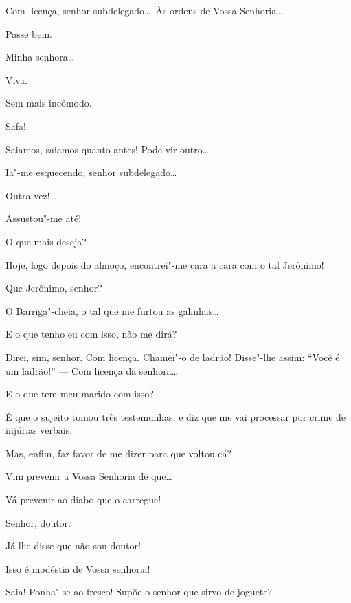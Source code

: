  Com licença, senhor subdelegado\ldots\ Às ordens de Vossa
Senhoria\ldots

 Passe bem.

 Minha senhora\ldots

 Viva. 

 Sem mais incômodo. 

 Safa!

 Saiamos, saiamos quanto antes! Pode vir outro\ldots\ 

  Ia"-me esquecendo, senhor
subdelegado\ldots

 Outra vez!

 Assustou"-me até!

 O que mais deseja?

 Hoje, logo depois do almoço, encontrei"-me cara a cara com o
tal Jerônimo!

 Que Jerônimo, senhor?

 O Barriga"-cheia, o tal que me furtou as galinhas\ldots

 E o que tenho eu com isso, não me dirá?

 Direi, sim, senhor. Com licença.  Chamei"-o de ladrão! Disse"-lhe assim: “Você é um ladrão!” --- Com licença da senhora\ldots

 E o que tem meu marido com isso?

 É que o sujeito tomou três testemunhas, e diz que me vai
processar por crime de injúrias verbais.

 Mas, enfim, faz favor de me dizer para que voltou cá?

 Vim prevenir a Vossa Senhoria de que\ldots

 Vá prevenir ao diabo que o carregue!

  Senhor, doutor.

  Já lhe disse que não sou doutor!

  Isso é modéstia de Vossa senhoria!

 Saia! Ponha"-se ao fresco! Supõe o senhor que sirvo de joguete?

